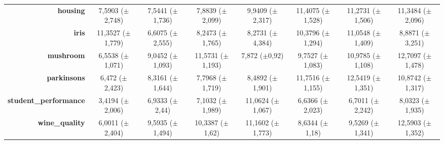\documentclass[preprint,review,12pt]{elsarticle}
\begin{document}
\begin{table}[!tb]
{\begin{tabular}{r|c|c|ccccc|}
			\textbf{housing}              & \cellcolor[rgb]{ 1,  .918,  .518}7,5903 ($\pm$2,748)                              & \cellcolor[rgb]{ 1,  .922,  .518}7,5441 ($\pm$1,736)    & \cellcolor[rgb]{ 1,  .878,  .51}7,8839 ($\pm$2,099)      & \cellcolor[rgb]{ .984,  .608,  .459}9,9409 ($\pm$2,317)  & \cellcolor[rgb]{ .973,  .412,  .42}11,4075 ($\pm$1,528)  & \cellcolor[rgb]{ .976,  .431,  .424}11,2731 ($\pm$1,506) & \cellcolor[rgb]{ .976,  .42,  .424}11,3484 ($\pm$2,096)  \\
			\textbf{iris}                 & \cellcolor[rgb]{ .973,  .412,  .42}11,3527 ($\pm$1,779)                           & \cellcolor[rgb]{ 1,  .922,  .518}6,6075 ($\pm$2,555)    & \cellcolor[rgb]{ .992,  .749,  .486}8,2473 ($\pm$1,765)  & \cellcolor[rgb]{ .992,  .745,  .486}8,2731 ($\pm$4,384)  & \cellcolor[rgb]{ .98,  .518,  .443}10,3796 ($\pm$1,294)  & \cellcolor[rgb]{ .976,  .447,  .427}11,0548 ($\pm$1,409) & \cellcolor[rgb]{ .988,  .678,  .471}8,8871 ($\pm$3,251)  \\
			\textbf{mushroom}             & \cellcolor[rgb]{ 1,  .922,  .518}6,5538 ($\pm$1,071)                              & \cellcolor[rgb]{ .992,  .718,  .478}9,0452 ($\pm$1,093) & \cellcolor[rgb]{ .98,  .51,  .439}11,5731 ($\pm$1,193)   & \cellcolor[rgb]{ .996,  .816,  .498}7,872 ($\pm$0,92)    & \cellcolor[rgb]{ .988,  .659,  .471}9,7527 ($\pm$1,083)  & \cellcolor[rgb]{ .98,  .557,  .451}10,9785 ($\pm$1,108)  & \cellcolor[rgb]{ .973,  .412,  .42}12,7097 ($\pm$1,478)  \\
			\textbf{parkinsons}           & \cellcolor[rgb]{ .875,  .882,  .51}6,472 ($\pm$2,423)                             & \cellcolor[rgb]{ .996,  .843,  .506}8,3161 ($\pm$1,644) & \cellcolor[rgb]{ 1,  .898,  .514}7,7968 ($\pm$1,719)     & \cellcolor[rgb]{ .996,  .827,  .502}8,4892 ($\pm$1,901)  & \cellcolor[rgb]{ .98,  .494,  .435}11,7516 ($\pm$1,155)  & \cellcolor[rgb]{ .973,  .412,  .42}12,5419 ($\pm$1,351)  & \cellcolor[rgb]{ .984,  .584,  .455}10,8742 ($\pm$1,317) \\
			\textbf{student\_performance} & \cellcolor[rgb]{ .514,  .78,  .486}3,4194 ($\pm$2,006)                            & \cellcolor[rgb]{ 1,  .902,  .514}6,9333 ($\pm$2,44)     & \cellcolor[rgb]{ 1,  .886,  .514}7,1032 ($\pm$1,989)     & \cellcolor[rgb]{ .98,  .537,  .443}11,0624 ($\pm$1,067)  & \cellcolor[rgb]{ .988,  .918,  .514}6,6366 ($\pm$2,023)  & \cellcolor[rgb]{ 1,  .922,  .518}6,7011 ($\pm$2,242)     & \cellcolor[rgb]{ .996,  .804,  .498}8,0323 ($\pm$1,935)  \\
			\textbf{wine\_quality}        & \cellcolor[rgb]{ 1,  .922,  .518}6,0011 ($\pm$2,404)                              & \cellcolor[rgb]{ .988,  .647,  .467}9,5935 ($\pm$1,494) & \cellcolor[rgb]{ .984,  .588,  .455}10,3387 ($\pm$1,62)  & \cellcolor[rgb]{ .98,  .525,  .443}11,1602 ($\pm$1,773)  & \cellcolor[rgb]{ .992,  .722,  .482}8,6344 ($\pm$1,18)   & \cellcolor[rgb]{ .988,  .651,  .467}9,5269 ($\pm$1,341)  & \cellcolor[rgb]{ .973,  .412,  .42}12,5903 ($\pm$1,352)  \\

\end{tabular}}
\end{table}
\end{document}
